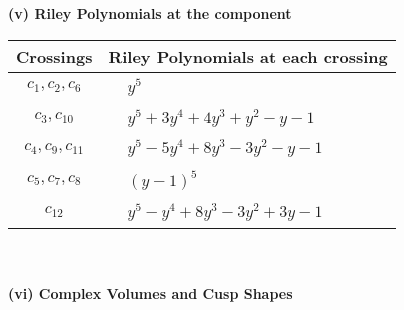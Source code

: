 \documentclass[1p]{elsarticle_modified}
\theoremstyle{definition}
\begin{document}
\newpage\renewcommand{\arraystretch}{1}
\flushleft \textbf{(v) Riley Polynomials at the component}\newline \\
\begin{tabular}{m{50pt}|m{274pt}}
Crossings & \hspace{64pt}Riley Polynomials at each crossing \\
\hline $$\begin{aligned}c_{1},c_{2},c_{6}\end{aligned}$$&$\begin{aligned}
&y^5
\end{aligned}$\\
\hline $$\begin{aligned}c_{3},c_{10}\end{aligned}$$&$\begin{aligned}
&y^5+3 y^4+4 y^3+y^2- y-1
\end{aligned}$\\
\hline $$\begin{aligned}c_{4},c_{9},c_{11}\end{aligned}$$&$\begin{aligned}
&y^5-5 y^4+8 y^3-3 y^2- y-1
\end{aligned}$\\
\hline $$\begin{aligned}c_{5},c_{7},c_{8}\end{aligned}$$&$\begin{aligned}
&(y-1)^5
\end{aligned}$\\
\hline $$\begin{aligned}c_{12}\end{aligned}$$&$\begin{aligned}
&y^5- y^4+8 y^3-3 y^2+3 y-1
\end{aligned}$\\
\hline
\end{tabular}\\~\\
\newpage\flushleft \textbf{(vi) Complex Volumes and Cusp Shapes}
\end{document}
